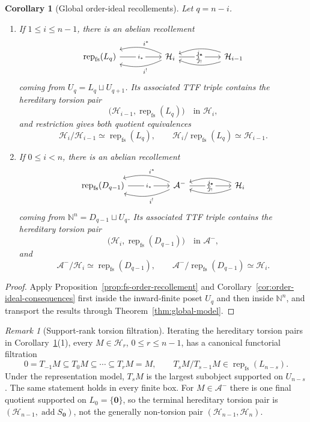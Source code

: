 \documentclass[12pt,reqno]{amsart}
\newtheorem{corollary}[theorem]{Corollary}
\theoremstyle{definition}
\theoremstyle{remark}
\newtheorem{remark}[theorem]{Remark}
\newcommand{\Rep}{\operatorname{rep}}
\begin{document}
\begin{corollary}[Global order-ideal recollements]
\label{cor:global-complementary-recollements}
Let $q=n-i$.
\begin{enumerate}[label=\rm(\arabic*)]
\item If $1\le i\le n-1$, there is an abelian recollement
\[
\begin{tikzcd}[column sep=5.0em]
\Rep_{\mathrm{fs}}(L_q)
  \arrow[r, "i_*" description]
& \mathcal H_i
  \arrow[l, bend right=20, "i^*"']
  \arrow[l, bend left=20, "i^!"]
  \arrow[r, "j^*" description]
& \mathcal H_{i-1}
  \arrow[l, bend left=20, "j_!"']
  \arrow[l, bend right=20, "j_*"]
\end{tikzcd}
\]
coming from $U_q=L_q\sqcup U_{q+1}$.
Its associated TTF triple contains the hereditary torsion pair
\[
\bigl(\mathcal H_{i-1},\Rep_{\mathrm{fs}}(L_q)\bigr)
\quad\text{in }\mathcal H_i,
\]
and restriction gives both quotient equivalences
\[
\mathcal H_i/\mathcal H_{i-1}\simeq\Rep_{\mathrm{fs}}(L_q),
\qquad
\mathcal H_i/\Rep_{\mathrm{fs}}(L_q)\simeq\mathcal H_{i-1}.
\]
\item If $0\le i<n$, there is an abelian recollement
\[
\begin{tikzcd}[column sep=5.0em]
\Rep_{\mathrm{fs}}(D_{q-1})
  \arrow[r, "i_*" description]
& \mathcal A^-
  \arrow[l, bend right=20, "i^*"']
  \arrow[l, bend left=20, "i^!"]
  \arrow[r, "j^*" description]
& \mathcal H_i
  \arrow[l, bend left=20, "j_!"']
  \arrow[l, bend right=20, "j_*"]
\end{tikzcd}
\]
coming from $\mathbb N^n=D_{q-1}\sqcup U_q$.
Its associated TTF triple contains the hereditary torsion pair
\[
\bigl(\mathcal H_i,\Rep_{\mathrm{fs}}(D_{q-1})\bigr)
\quad\text{in }\mathcal A^-,
\]
and
\[
\mathcal A^-/\mathcal H_i\simeq\Rep_{\mathrm{fs}}(D_{q-1}),
\qquad
\mathcal A^-/\Rep_{\mathrm{fs}}(D_{q-1})\simeq\mathcal H_i.
\]
\end{enumerate}
\end{corollary}

\begin{proof}
Apply Proposition~\ref{prop:fs-order-recollement} and
Corollary~\ref{cor:order-ideal-consequences} first inside the inward-finite
poset $U_q$ and then inside $\mathbb N^n$, and transport the results through
Theorem~\ref{thm:global-model}.
\end{proof}


\begin{remark}[Support-rank torsion filtration]\label{rem:support-rank-torsion-filtration}
Iterating the hereditary torsion pairs in
Corollary~\ref{cor:global-complementary-recollements}(1), every
$M\in\mathcal H_r$, $0\le r\le n-1$, has a canonical functorial filtration
\[
0=T_{-1}M\subseteq T_0M\subseteq\cdots\subseteq T_rM=M,
\qquad
T_sM/T_{s-1}M\in\Rep_{\mathrm{fs}}(L_{n-s}).
\]
Under the representation model, $T_sM$ is the largest subobject supported on
$U_{n-s}$.  The same statement holds in every finite box.  For
$M\in\mathcal A^-$ there is one final quotient supported on
$L_0=\{\mathbf0\}$, so the terminal hereditary torsion pair is
$(\mathcal H_{n-1},\operatorname{add}S_{\mathbf0})$, not the generally
non-torsion pair $(\mathcal H_{n-1},\mathcal H_n)$.
\end{remark}
\end{document}
